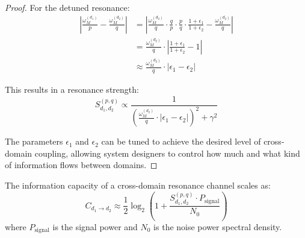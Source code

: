 \begin{proof}
For the detuned resonance:
\begin{align}
\left|\frac{\omega_{M}^{(d_1)}}{p} - \frac{\omega_{M}^{(d_2)}}{q}\right| &= \left|\frac{\omega_{M}^{(d_2)}}{q} \cdot \frac{q}{p} \cdot \frac{p}{q} \cdot \frac{1 + \epsilon_1}{1 + \epsilon_2} - \frac{\omega_{M}^{(d_2)}}{q}\right| \\
&= \frac{\omega_{M}^{(d_2)}}{q} \cdot \left|\frac{1 + \epsilon_1}{1 + \epsilon_2} - 1\right| \\
&\approx \frac{\omega_{M}^{(d_2)}}{q} \cdot |\epsilon_1 - \epsilon_2|
\end{align}

This results in a resonance strength:
\begin{equation}
S_{d_1,d_2}^{(p,q)} \propto \frac{1}{\left(\frac{\omega_{M}^{(d_2)}}{q} \cdot |\epsilon_1 - \epsilon_2|\right)^2 + \gamma^2}
\end{equation}

The parameters $\epsilon_1$ and $\epsilon_2$ can be tuned to achieve the desired level of cross-domain coupling, allowing system designers to control how much and what kind of information flows between domains.
\end{proof}

\begin{theorem}
The information capacity of a cross-domain resonance channel scales as:
\begin{equation}
C_{d_1 \to d_2} \approx \frac{1}{2}\log_2\left(1 + \frac{S_{d_1,d_2}^{(p,q)} \cdot P_{\text{signal}}}{N_0}\right)
\end{equation}
where $P_{\text{signal}}$ is the signal power and $N_0$ is the noise power spectral density.
\end{theorem}

